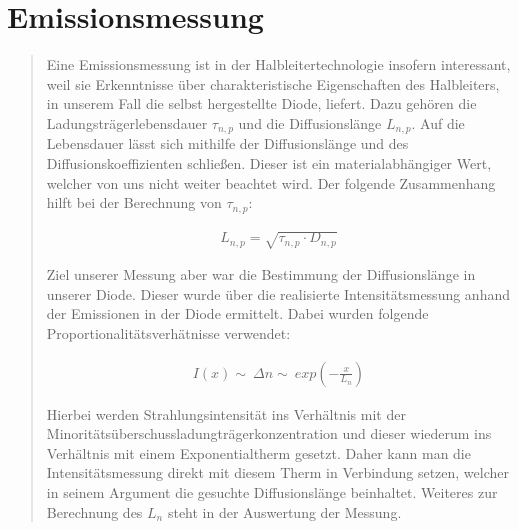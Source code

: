 \newpage

\section{Emissionsmessung}
\begin{quote}

    Eine Emissionsmessung ist in der Halbleitertechnologie insofern interessant,
    weil sie Erkenntnisse über charakteristische Eigenschaften des Halbleiters,
    in unserem Fall die selbst hergestellte Diode, liefert. Dazu gehören die
    Ladungsträgerlebensdauer $\tau_{n,p}$ und die Diffusionslänge $L_{n,p}$. Auf
    die Lebensdauer lässt sich mithilfe der Diffusionslänge und des
    Diffusionskoeffizienten schließen. Dieser ist ein materialabhängiger Wert,
    welcher von uns nicht weiter beachtet wird. Der folgende Zusammenhang hilft
    bei der Berechnung von $\tau_{n,p}$:

    \begin{equation*}
        \begin{split}
            L_{n,p} = \sqrt{\tau_{n,p} \cdot D_{n,p}}
        \end{split}
    \end{equation*}

    Ziel unserer Messung aber war die Bestimmung der Diffusionslänge in unserer
    Diode. Dieser wurde über die realisierte Intensitätsmessung anhand der
    Emissionen in der Diode ermittelt. Dabei wurden folgende
    Proportionalitätsverhätnisse verwendet:

    \begin{equation*}
        \begin{split}
            I(x) \sim \ \Delta n \sim \ exp(-\frac{x}{L_n})
        \end{split}
    \end{equation*}

    Hierbei werden Strahlungsintensität ins Verhältnis mit der\\
    Minoritätsüberschussladungträgerkonzentration und dieser wiederum
    ins Verhältnis mit einem Exponentialtherm gesetzt. Daher kann man die
    Intensitätsmessung direkt mit diesem Therm in Verbindung setzen,
    welcher in seinem Argument die gesuchte Diffusionslänge beinhaltet. Weiteres
    zur Berechnung des $L_n$ steht in der Auswertung der Messung.\\


\end{quote}
